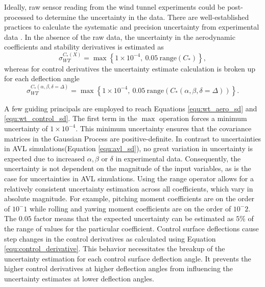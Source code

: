 Ideally, raw sensor reading from the wind tunnel experiments could be post-processed to determine the uncertainty in the data.
There are well-established practices to calculate the systematic and precision uncertainty from experimental data \cite{coleman1995engineering}.
In the absence of the raw data, the uncertainty in the aerodynamic coefficients and stability derivatives is estimated as 
\begin{equation}\label{equ:wt_aero_sd}
    \sigma_{WT}^{C_*(X)} = \max \left \{ 1\times 10^{-4},~0.05~\mathrm{range}(C_*) \right \},
\end{equation}
whereas for control derivatives the uncertainty estimate calculation is broken up for each deflection angle
\begin{equation} \label{equ:wt_control_sd}
    \sigma_{WT}^{C_*(\alpha,\beta,\delta=\Delta)} = \max \left \{ 1\times 10^{-4},~0.05~\mathrm{range}(C_*(\alpha,\beta,\delta=\Delta)) \right \}.
\end{equation}

A few guiding principals are employed to reach Equations \ref{equ:wt_aero_sd} and \ref{equ:wt_control_sd}.
The first term in the $\max$ operation forces a minimum uncertainty of $1\times10^{-4}$.
This minimum uncertainty ensures that the covariance matrices in the Gaussian Process are positive-definite.
In contrast to uncertainties in AVL simulations(Equation \ref{equ:avl_sd}), no great variation in uncertainty is expected due to increased $\alpha, \beta$ or $\delta$ in experimental data. 
Consequently, the uncertainty is not dependent on the magnitude of the input variables, as is the case for uncertainties in AVL simulations. 
Using the range operator allows for a relatively consistent uncertainty estimation across all coefficients, which vary in absolute magnitude. 
For example, pitching moment coefficients are on the order of $10^-1$ while rolling and yawing moment coefficients are on the order of $10^-2$.
The $0.05$ factor means that the expected uncertainty can be estimated as $5\%$ of the range of values for the particular coefficient. 
Control surface deflections cause step changes in the control derivatives as calculated using Equation \ref{equ:control_derivative}.
This behavior necessitates the breakup of the uncertainty estimation for each control surface deflection angle. 
It prevents the higher control derivatives at higher deflection angles from influencing the uncertainty estimates at lower deflection angles.

